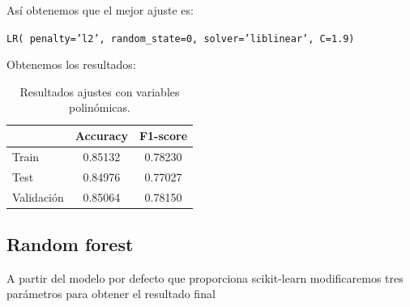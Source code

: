 \documentclass[11pt,a4paper]{article}
\begin{document}
Así obtenemos que el mejor ajuste es:

{\begin{center}
    \texttt{LR( penalty='l2', random\_state=0, solver='liblinear', C=1.9)}
  \end{center}}

Obtenemos los resultados:

\begin{table}[h]
\begin{center}
\begin{tabular}{|l|c|c|}
\hline
 & Accuracy & F1-score \\ \hline
Train & 0.85132 & 0.78230 \\
 Test & 0.84976 & 0.77027  \\
  Validación &0.85064 & 0.78150  \\\hline
\end{tabular}
\label{tab:resultlin}
\caption{Resultados ajustes con variables polinómicas.}

\end{center}
\end{table}

\newpage
\subsection{Random forest}

A partir del modelo por defecto que proporciona scikit-learn modificaremos tres parámetros para obtener el resultado final
\end{document}
